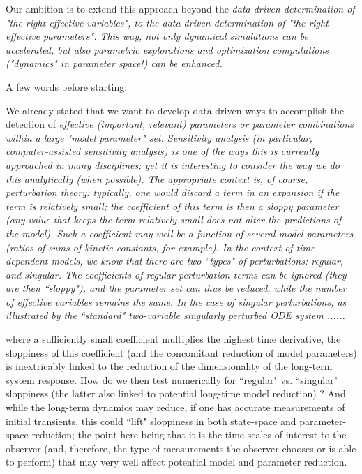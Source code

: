\documentclass{article}
\begin{document}
Our ambition is to extend this approach beyond the \em{data-driven} determination of "the right effective
variables", to the data-driven determination of "the right effective parameters".
%
This way, not only dynamical simulations can be accelerated, but also
parametric explorations and optimization computations ("dynamics" in parameter space!) can be
enhanced.


A few words before starting:

We already stated that we want to develop data-driven ways to accomplish the detection of 
\em{effective} (important, relevant) parameters or parameter combinations within a large "model parameter" set.
%
Sensitivity analysis (in particular, computer-assisted sensitivity analysis) is one of the ways this is
currently approached in many disciplines; yet it is interesting to consider the way we do this analytically 
(when possible). 
%
The appropriate context is, of course, perturbation theory: typically, one would discard a term in an expansion
if the term is relatively small; the coefficient of this term is then a sloppy parameter (any value that
keeps the term relatively small does not alter the predictions of the model). 
%
Such a coefficient may well be
a function of several model parameters (ratios of sums of kinetic constants, for example). 
%
In the context of \em{time-dependent models}, we know that there are two ``types" of perturbations:
regular, and singular. 
%
The coefficients of \em{regular} perturbation terms can be ignored (they are then ``sloppy"), and the
parameter set can thus be reduced, while the number of effective variables remains the same.
%
In the case of \em{singular} perturbations,  as illustrated by the ``standard" two-variable singularly
perturbed ODE system
......


where a sufficiently small coefficient multiplies the highest
time derivative, the sloppiness of this coefficient (and the concomitant reduction of model parameters) 
is inextricably linked to the reduction of the dimensionality of the long-term system response.
%
How do we then test numerically for ``regular" vs. ``singular" sloppiness (the latter
also linked to potential long-time model reduction) ? 
%
And while the long-term dynamics may reduce, if one has accurate measurements of initial transients, 
this could ``lift" sloppiness in both state-space and parameter-space reduction; the point here being
that it is the time scales of interest to the observer (and, therefore, the type of measurements the
observer chooses or is able to perform) that may very well affect potential model and parameter reduction.
\end{document}
